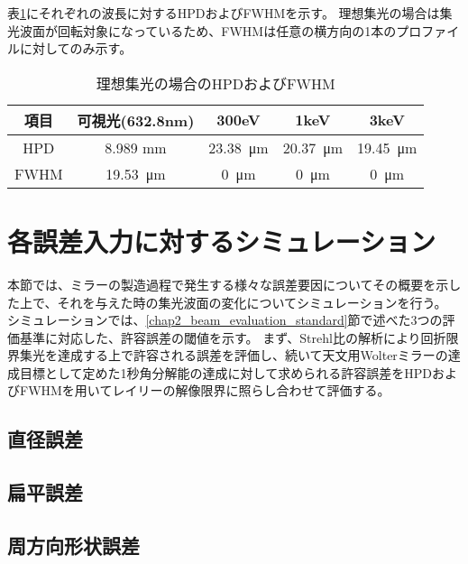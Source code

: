表\ref{tb:ideal_focus_evaluation}にそれぞれの波長に対するHPDおよびFWHMを示す。
理想集光の場合は集光波面が回転対象になっているため、FWHMは任意の横方向の1本のプロファイルに対してのみ示す。

\begin{table}[!ht]
\begin{center}
  \begin{tabular}{|c|c|c|c|c|} \hline
    項目 & 可視光(632.8nm) & 300eV & 1keV & 3keV \\ \hline
    HPD & 8.989 mm & \SI{23.38}{\micro \metre} & \SI{20.37}{\micro \metre} & \SI{19.45}{\micro \metre} \\
    FWHM & \SI{19.53}{\micro \metre} & \SI{0}{\micro \metre} & \SI{0}{\micro \metre} & \SI{0}{\micro \metre} \\ \hline
  \end{tabular}
  \caption{理想集光の場合のHPDおよびFWHM}
  \label{tb:ideal_focus_evaluation}
\end{center}
\end{table}

\clearpage
\newpage

\section{各誤差入力に対するシミュレーション}
\label{chap2_simulation_error_response}

本節では、ミラーの製造過程で発生する様々な誤差要因についてその概要を示した上で、それを与えた時の集光波面の変化についてシミュレーションを行う。
シミュレーションでは、\ref{chap2_beam_evaluation_standard}節で述べた3つの評価基準に対応した、許容誤差の閾値を示す。
まず、Strehl比の解析により回折限界集光を達成する上で許容される誤差を評価し、続いて天文用Wolterミラーの達成目標として定めた1秒角分解能の達成に対して求められる許容誤差をHPDおよびFWHMを用いてレイリーの解像限界に照らし合わせて評価する。

\subsection{直径誤差}

\subsection{扁平誤差}

\subsection{周方向形状誤差}

